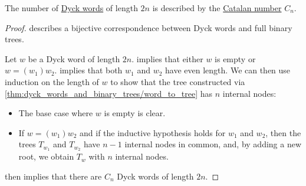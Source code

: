 \begin{corollary}\label{thm:dyck_word_count}
  The number of \hyperref[def:dyck_language]{Dyck words} of length \( 2n \) is described by the \hyperref[def:catalan_number]{Catalan number} \( C_n \).
\end{corollary}
\begin{proof}
   describes a bijective correspondence between Dyck words and full binary trees.

  Let \( w \) be a Dyck word of length \( 2n \).  implies that either \( w \) is empty or \( w = (w_1) w_2 \).  implies that both \( w_1 \) and \( w_2 \) have even length. We can then use induction on the length of \( w \) to show that the tree constructed via \cref{thm:dyck_words_and_binary_trees/word_to_tree} has \( n \) internal nodes:
  \begin{itemize}
    \item The base case where \( w \) is empty is clear.
    \item If \( w = (w_1) w_2 \) and if the inductive hypothesis holds for \( w_1 \) and \( w_2 \), then the trees \( T_{w_1} \) and \( T_{w_2} \) have \( n - 1 \) internal nodes in common, and, by adding a new root, we obtain \( T_w \) with \( n \) internal nodes.
  \end{itemize}

   then implies that there are \( C_n \) Dyck words of length \( 2n \).
\end{proof}
